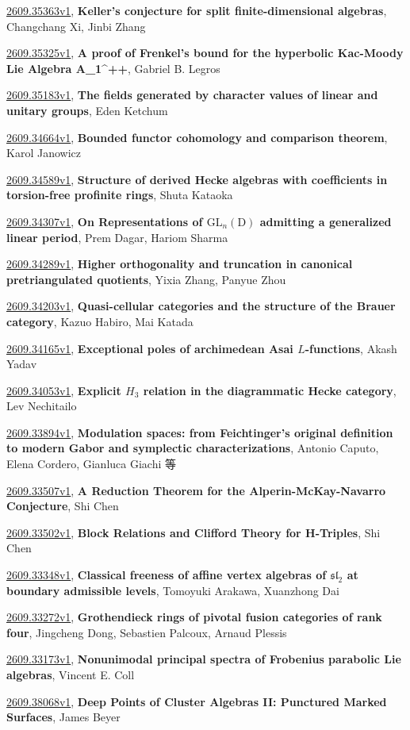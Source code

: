 \documentclass[9pt, a4paper]{article}
\theoremstyle{plain}
\theoremstyle{definition}
\theoremstyle{remark}
\newcommand{\arxiv}[3]{\href{https://arxiv.org/abs/#1}{#1}, \textbf{\textcolor{arxivblue}{#2}}, #3}
\begin{document}
\arxiv{2609.35363v1}{Keller's conjecture for split finite-dimensional algebras}{Changchang Xi, Jinbi Zhang}

\arxiv{2609.35325v1}{A proof of Frenkel's bound for the hyperbolic Kac-Moody Lie Algebra A_1^++}{Gabriel B. Legros}

\arxiv{2609.35183v1}{The fields generated by character values of linear and unitary groups}{Eden Ketchum}

\arxiv{2609.34664v1}{Bounded functor cohomology and comparison theorem}{Karol Janowicz}

\arxiv{2609.34589v1}{Structure of derived Hecke algebras with coefficients in torsion-free profinite rings}{Shuta Kataoka}

\arxiv{2609.34307v1}{On Representations of $\mathrm{GL}_n(\mathrm{D})$ admitting a generalized linear period}{Prem Dagar, Hariom Sharma}

\arxiv{2609.34289v1}{Higher orthogonality and truncation in canonical pretriangulated quotients}{Yixia Zhang, Panyue Zhou}

\arxiv{2609.34203v1}{Quasi-cellular categories and the structure of the Brauer category}{Kazuo Habiro, Mai Katada}

\arxiv{2609.34165v1}{Exceptional poles of archimedean Asai $L$-functions}{Akash Yadav}

\arxiv{2609.34053v1}{Explicit $H_3$ relation in the diagrammatic Hecke category}{Lev Nechitailo}

\arxiv{2609.33894v1}{Modulation spaces: from Feichtinger's original definition to modern Gabor and symplectic characterizations}{Antonio Caputo, Elena Cordero, Gianluca Giachi 等}

\arxiv{2609.33507v1}{A Reduction Theorem for the Alperin-McKay-Navarro Conjecture}{Shi Chen}

\arxiv{2609.33502v1}{Block Relations and Clifford Theory for H-Triples}{Shi Chen}

\arxiv{2609.33348v1}{Classical freeness of affine vertex algebras of $\mathfrak{sl}_2$ at boundary admissible levels}{Tomoyuki Arakawa, Xuanzhong Dai}

\arxiv{2609.33272v1}{Grothendieck rings of pivotal fusion categories of rank four}{Jingcheng Dong, Sebastien Palcoux, Arnaud Plessis}

\arxiv{2609.33173v1}{Nonunimodal principal spectra of Frobenius parabolic Lie algebras}{Vincent E. Coll}

\arxiv{2609.38068v1}{Deep Points of Cluster Algebras II: Punctured Marked Surfaces}{James Beyer}
\end{document}
